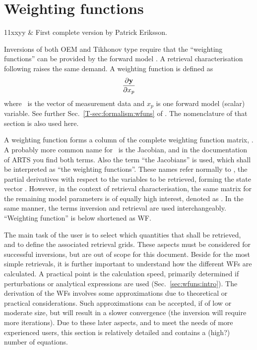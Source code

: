 \chapter{Weighting functions}
 \label{sec:wfuns}

 \starthistory
 11xxyy & First complete version by Patrick Eriksson.\\
 \stophistory

\graphicspath{{Figs/wfuns/}}


Inversions of both OEM and Tikhonov type require that the ``weighting
functions'' can be provided by the forward model \citep[see
e.g.][]{eriksson:analy:00}. A retrieval characterisation following
\citet{rodgers:90} raises the same demand. A weighting function is defined as 
\begin{equation}
  \frac{\partial \mathbf{y}}{\partial x_p}
  \label{eq:wfuns:ki}
\end{equation}
where \MsrVct\ is the vector of measurement data and $x_p$ is one forward model
(scalar) variable. See further Sec.~\ref{T-sec:formalism:wfuns} of \theory.
The nomenclature of that section is also used here.

A weighting function forms a column of the complete weighting function matrix,
\aWfnMtr{\SttVct}. A probably more common name for \aWfnMtr{\SttVct}\ is the
Jacobian, and in the documentation of ARTS you find both terms. Also the term
``the Jacobians'' is used, which shall be interpreted as ``the weighting
functions''. These names refer normally to \aWfnMtr{\SttVct}, the partial
derivatives with respect to the variables to be retrieved, forming the state
vector \SttVct. However, in the context of retrieval characterisation, the same
matrix for the remaining model parameters is of equally high interest, denoted
as \aWfnMtr{\FrwMdlVct}. In the same manner, the terms inversion and retrieval
are used interchangeably. ``Weighting function'' is below shortened as WF.

The main task of the user is to select which quantities that shall be
retrieved, and to define the associated retrieval grids. These aspects must be
considered for successful inversions, but are out of scope for this document.
Beside for the most simple retrievals, it is further important to understand
how the different WFs are calculated. A practical point is the calculation
speed, primarily determined if perturbations or analytical expressions are used
(Sec.~\ref{sec:wfuns:intro}). The derivation of the WFs involves some
approximations due to theoretical or practical considerations. Such
approximations can be accepted, if of low or moderate size, but will result in
a slower convergence (the inversion will require more iterations). Due to these
later aspects, and to meet the needs of more experienced users, this section is
relatively detailed and contains a (high?) number of equations.




